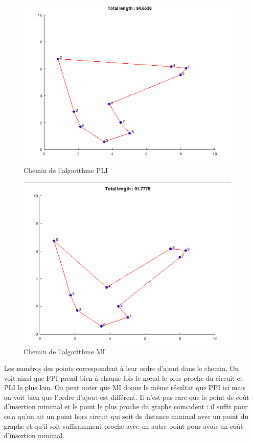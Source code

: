 \documentclass[10pt,a4paper]{article}
\begin{document}
\begin{figure}[!ht]
    \centering
    \includegraphics[width=0.8\linewidth]{img/PLI1.png}
    \caption{Chemin de l'algorithme PLI}
    \label{PLI1}
\end{figure}

\begin{figure}[!ht]
    \centering
    \includegraphics[width=0.8\linewidth]{img/MI1.png}
    \caption{Chemin de l'algorithme MI}
    \label{MI1}
\end{figure}

Les numéros des points correspondent à leur ordre d'ajout dans le chemin.
On voit ainsi que PPI prend bien à chaque fois le nœud le plus proche du circuit
et PLI le plus loin. On peut noter que MI donne le même résultat que PPI ici mais
on voit bien que l'ordre d'ajout est différent. Il n'est pas rare que le point de coût
d'insertion minimal et le point le plus proche du graphe coïncident : il suffit pour cela qu'on ait
un point hors circuit qui soit de distance minimal avec un point du graphe et qu'il soit suffisamment proche avec
un autre point pour avoir un coût d'insertion minimal.
\end{document}

